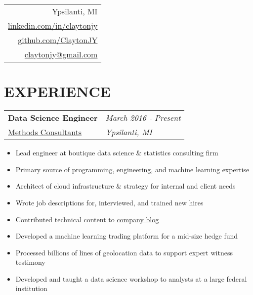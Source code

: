 \documentclass[margin,line]{res}
\begin{document}


\begin{resume}

\vspace{-.15in}
\hfill
\begin{tabular}{r}
  Ypsilanti, MI\\
  \href{http://www.linkedin.com/in/claytonjy}{linkedin.com/in/claytonjy}\\
  \href{https://github.com/ClaytonJY}{github.com/ClaytonJY} \\
  \href{mailto:claytonjy@gmail.com}{claytonjy@gmail.com} \\
\end{tabular}


\section{EXPERIENCE}

\begin{tabular}{p{4.4in} l}
  {\bf Data Science Engineer} & \emph{March 2016 - Present}\\
  \href{http://www.methodsconsultants.com/}{Methods Consultants} & \emph{Ypsilanti, MI}
\end{tabular}
\vspace{2pt}
\begin{itemize}\itemsep -2pt
  \item Lead engineer at boutique data science \& statistics consulting firm
  \item Primary source of programming, engineering, and machine learning expertise
  \item Architect of cloud infrastructure \& strategy for internal and client needs
  \item Wrote job descriptions for, interviewed, and trained new hires
  \item Contributed technical content to \href{https://blog.methodsconsultants.com}{company blog}
  \item Developed a machine learning trading platform for a mid-size hedge fund
  \item Processed billions of lines of geolocation data to support expert witness testimony
  \item Developed and taught a data science workshop to analysts at a large federal institution
\end{itemize}


\end{resume}
\end{document}

